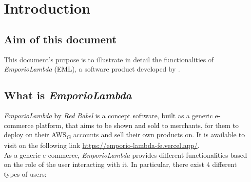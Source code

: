 \section{Introduction}
\subsection{Aim of this document}
This document's purpose is to illustrate in detail the functionalities of \textit{EmporioLambda} (EML), a software product developed by \Omicron .
\subsection{What is \textit{EmporioLambda}}
\textit{EmporioLambda} by \textit{Red Babel} is a concept software, built as a generic e-commerce platform, that aims to be shown and sold to merchants, for them to deploy on their AWS\textsubscript{G} accounts and sell their own products on. It is available to visit on the following link \url{https://emporio-lambda-fe.vercel.app/}.\\
As a generic e-commerce, \textit{EmporioLambda} provides different functionalities based on the role of the user interacting with it. In particular, there exist 4 different types of users:
